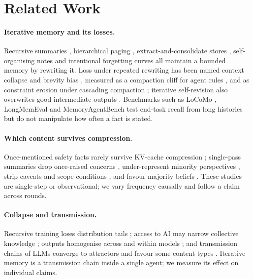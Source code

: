 \section{Related Work}
\label{sec:related}

\paragraph{Iterative memory and its losses.}
Recursive summaries \citep{wang2023recursively}, hierarchical paging \citep{packer2023memgpt}, extract-and-consolidate stores \citep{chhikara2025mem0}, self-organising notes \citep{xu2025amem} and intentional forgetting curves \citep{zhong2024memorybank} all maintain a bounded memory by rewriting it.
Loss under repeated rewriting has been named context collapse and brevity bias \citep{zhang2026ace}, measured as a compaction cliff for agent rules \citep{zerhoudi2026compaction}, and as constraint erosion under cascading compaction \citep{zahn2026facts}; iterative self-revision also overwrites good intermediate outputs \citep{javaji-etal-2026-another}.
Benchmarks such as LoCoMo \citep{maharana-etal-2024-evaluating}, LongMemEval \citep{wu2025longmemeval} and MemoryAgentBench \citep{hu2026memoryagentbench} test end-task recall from long histories but do not manipulate how often a fact is stated.

\paragraph{Which content survives compression.}
Once-mentioned safety facts rarely survive KV-cache compression \citep{zhu2026allergy}; single-pass summaries drop once-raised concerns \citep{tamme2027voice}, under-represent minority perspectives \citep{zhang-etal-2024-fair,zhu2025deliberation,huang-etal-2024-bias,shandilya2018fairness}, strip caveats and scope conditions \citep{peters2025generalization,lee2026summaries}, and favour majority beliefs \citep{aghaebe2026belief}.
These studies are single-step or observational; we vary frequency causally and follow a claim across rounds.

\paragraph{Collapse and transmission.}
Recursive training loses distribution tails \citep{shumailov2024collapse}; access to AI may narrow collective knowledge \citep{peterson2025knowledge}; outputs homogenise across and within models \citep{wu2025monoculture,wright-etal-2026-whose}; and transmission chains of LLMs converge to attractors and favour some content types \citep{perez2025telephone,acerbi2023transmission}.
Iterative memory is a transmission chain inside a single agent; we measure its effect on individual claims.

